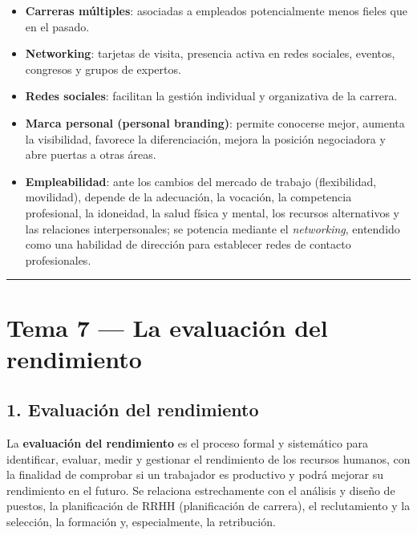 \documentclass[12pt]{book} %
\providecommand{\tightlist}{%
  \setlength{\itemsep}{0pt}\setlength{\parskip}{0pt}}
\begin{document}
\begin{itemize}
\tightlist
\item
  \textbf{Carreras múltiples}: asociadas a empleados potencialmente
  menos fieles que en el pasado.
\item
  \textbf{Networking}: tarjetas de visita, presencia activa en redes
  sociales, eventos, congresos y grupos de expertos.
\item
  \textbf{Redes sociales}: facilitan la gestión individual y
  organizativa de la carrera.
\item
  \textbf{Marca personal (personal branding)}: permite conocerse mejor,
  aumenta la visibilidad, favorece la diferenciación, mejora la posición
  negociadora y abre puertas a otras áreas.
\item
  \textbf{Empleabilidad}: ante los cambios del mercado de trabajo
  (flexibilidad, movilidad), depende de la adecuación, la vocación, la
  competencia profesional, la idoneidad, la salud física y mental, los
  recursos alternativos y las relaciones interpersonales; se potencia
  mediante el \emph{networking}, entendido como una habilidad de
  dirección para establecer redes de contacto profesionales.
\end{itemize}

\begin{center}\rule{0.5\linewidth}{0.5pt}\end{center}

\hypertarget{tema-7-la-evaluaciuxf3n-del-rendimiento}{%
\chapter{Tema 7 --- La evaluación del
rendimiento}\label{tema-7-la-evaluaciuxf3n-del-rendimiento}}

\hypertarget{evaluaciuxf3n-del-rendimiento}{%
\section{1. Evaluación del
rendimiento}\label{evaluaciuxf3n-del-rendimiento}}

La \textbf{evaluación del rendimiento} es el proceso formal y
sistemático para identificar, evaluar, medir y gestionar el rendimiento
de los recursos humanos, con la finalidad de comprobar si un trabajador
es productivo y podrá mejorar su rendimiento en el futuro. Se relaciona
estrechamente con el análisis y diseño de puestos, la planificación de
RRHH (planificación de carrera), el reclutamiento y la selección, la
formación y, especialmente, la retribución.
\end{document}

